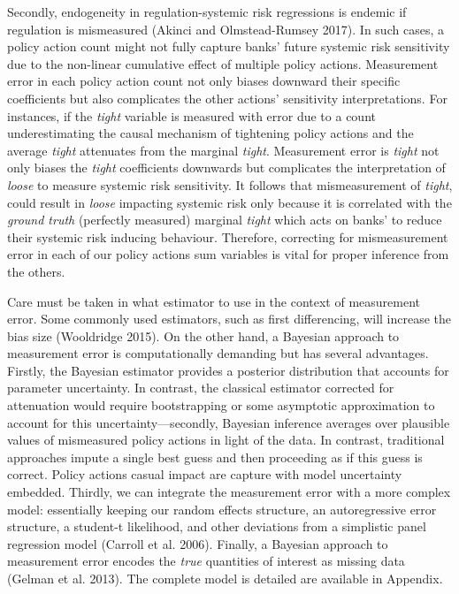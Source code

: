 \documentclass[
  10pt,
]{article}
\begin{document}
Secondly, endogeneity in regulation-systemic risk regressions is endemic
if regulation is mismeasured (Akinci and Olmstead-Rumsey 2017). In such
cases, a policy action count might not fully capture banks' future
systemic risk sensitivity due to the non-linear cumulative effect of
multiple policy actions. Measurement error in each policy action count
not only biases downward their specific coefficients but also
complicates the other actions' sensitivity interpretations. For
instances, if the \emph{tight} variable is measured with error due to a
count underestimating the causal mechanism of tightening policy actions
and the average \emph{tight} attenuates from the marginal \emph{tight}.
Measurement error is \emph{tight} not only biases the \emph{tight}
coefficients downwards but complicates the interpretation of
\emph{loose} to measure systemic risk sensitivity. It follows that
mismeasurement of \emph{tight}, could result in \emph{loose} impacting
systemic risk only because it is correlated with the \emph{ground truth}
(perfectly measured) marginal \emph{tight} which acts on banks' to
reduce their systemic risk inducing behaviour. Therefore, correcting for
mismeasurement error in each of our policy actions sum variables is
vital for proper inference from the others.

Care must be taken in what estimator to use in the context of
measurement error. Some commonly used estimators, such as first
differencing, will increase the bias size (Wooldridge 2015). On the
other hand, a Bayesian approach to measurement error is computationally
demanding but has several advantages. Firstly, the Bayesian estimator
provides a posterior distribution that accounts for parameter
uncertainty. In contrast, the classical estimator corrected for
attenuation would require bootstrapping or some asymptotic approximation
to account for this uncertainty---secondly, Bayesian inference averages
over plausible values of mismeasured policy actions in light of the
data. In contrast, traditional approaches impute a single best guess and
then proceeding as if this guess is correct. Policy actions casual
impact are capture with model uncertainty embedded. Thirdly, we can
integrate the measurement error with a more complex model: essentially
keeping our random effects structure, an autoregressive error structure,
a student-t likelihood, and other deviations from a simplistic panel
regression model (Carroll et al. 2006). Finally, a Bayesian approach to
measurement error encodes the \emph{true} quantities of interest as
missing data (Gelman et al. 2013). The complete model is detailed are
available in Appendix.
\end{document}
